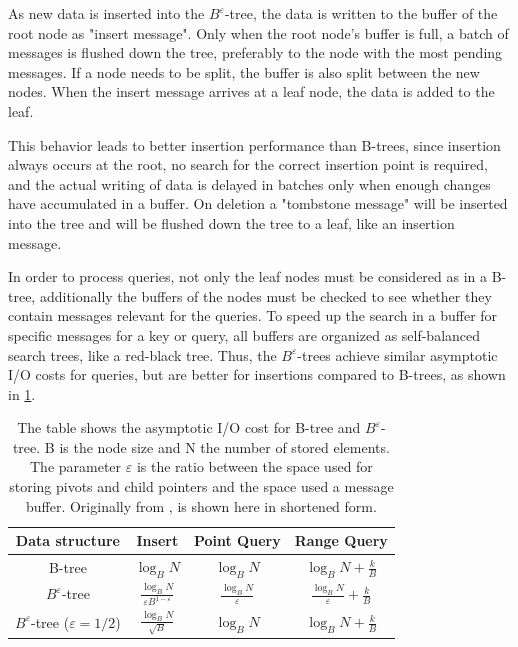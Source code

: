 \documentclass[
	12pt,
	a4paper,
	abstract,
	bibliography=totoc,
	chapterprefix,
	headings=openright,
	numbers=endperiod,
	parskip=half,
	twoside,
]{scrreprt}
\begin{document}
As new data is inserted into the $B^{\varepsilon}$-tree, the data is written to the buffer of the root 
node as "insert message".
Only when the root node's buffer is full, a batch of messages is flushed down the tree, 
preferably to the node with the most pending messages. 
If a node needs to be split, the buffer is also split between the new nodes.
When the insert message arrives at a leaf node, the data is added to the leaf.

This behavior leads to better insertion performance than B-trees, since insertion always occurs at the root, 
no search for the correct insertion point is required, and  
the actual writing of data is delayed in batches only when enough changes have accumulated in a buffer.
On deletion a "tombstone message" will be inserted into the tree and will be flushed down the tree to a leaf, 
like an insertion message.

In order to process queries, not only the leaf nodes must be considered as in a B-tree, 
additionally the buffers of the nodes must be checked to see whether they contain messages relevant for the queries.
To speed up the search in a buffer for specific messages for a key or query, 
all buffers are organized as self-balanced search trees, like a red-black tree.
Thus, the $B^{\varepsilon}$-trees achieve similar asymptotic I/O costs for queries, 
but are better for insertions compared to B-trees,
as shown in \cref{tab:comparison trees}.

\begin{table}[ht]
	\centering
	\begin{tabular}{|c|c|c|c|}
		\hline
		\textbf{Data structure} & \textbf{Insert} & \textbf{Point Query}  & \textbf{Range Query}\\
		\hline
		B-tree & $\log_{B} N$ & $\log_{B} N$ & $\log_{B} N + \frac{k}{B}$\\
		\hline
		$B^{\varepsilon}$-tree & $ \frac{\log_{B} N}{\varepsilon B^{1 - \varepsilon}}$ & $ \frac{\log_{B} N}{\varepsilon}$ 
		& $ \frac{\log_{B} N}{\varepsilon} + \frac{k}{B}$ \\
		\hline
		$B^{\varepsilon}$-tree ($\varepsilon = 1/2$) & $ \frac{\log_{B} N}{\sqrt{B}}$ & $\log_{B} N$ & $\log_{B} N + \frac{k}{B}$ \\
		\hline
	\end{tabular}
	\caption{The table shows the asymptotic I/O cost for B-tree and $B^{\varepsilon}$-tree.
			B is the node size and N the number of stored elements. 
			The parameter $\varepsilon$ is the ratio between the space used for storing pivots and 
			child pointers and the space used a message buffer. Originally from \cite{bender2015introduction}, is shown here in shortened form.}
	\label{tab:comparison trees}
\end{table}
\end{document}
